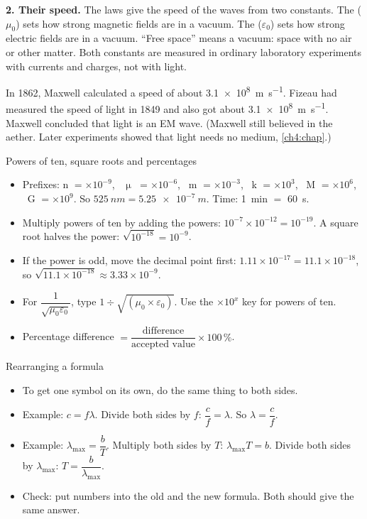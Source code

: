 \textbf{2. Their speed.} The laws give the speed of the waves from two constants. The
 ($\mu_0$) sets how strong magnetic fields are in a vacuum.
The  ($\varepsilon_0$) sets how strong electric fields are in
a vacuum. ``Free space'' means a vacuum: space with no air or other matter. Both constants are
measured in ordinary laboratory experiments with currents and charges, not with light.

In 1862, Maxwell calculated a speed of about \qty{3.1e8}{m.s^{-1}}. Fizeau had measured the
speed of light in 1849 and also got about \qty{3.1e8}{m.s^{-1}}. Maxwell concluded that light is
an EM wave. (Maxwell still believed in the aether. Later experiments showed that light needs no
medium, \cref{ch4:chap}.)

\begin{toolkit}{Powers of ten, square roots and percentages}
\begin{itemize}
  \item Prefixes: n $=\times10^{-9}$, \ $\upmu$ $=\times10^{-6}$, \ m $=\times10^{-3}$,
        \ k $=\times10^{3}$, \ M $=\times10^{6}$, \ G $=\times10^{9}$. So
        $\qty{525}{nm} = \qty{5.25e-7}{m}$. Time: \qty{1}{min} $=$ \qty{60}{s}.
  \item Multiply powers of ten by adding the powers: $10^{-7}\times10^{-12} = 10^{-19}$. A
        square root halves the power: $\sqrt{10^{-18}} = 10^{-9}$.
  \item If the power is odd, move the decimal point first: $1.11\times10^{-17} =
        11.1\times10^{-18}$, so $\sqrt{11.1\times10^{-18}} \approx 3.33\times10^{-9}$.
  \item For $\dfrac{1}{\sqrt{\mu_0\varepsilon_0}}$, type $1 \div \sqrt{(\mu_0 \times
        \varepsilon_0)}$. Use the $\times10^{x}$ key for powers of ten.
  \item Percentage difference $= \dfrac{\text{difference}}{\text{accepted value}}\times100\,\%$.
\end{itemize}
\end{toolkit}

\begin{toolkit}{Rearranging a formula}
\begin{itemize}
  \item To get one symbol on its own, do the same thing to both sides.
  \item Example: $c = f\lambda$. Divide both sides by $f$: $\dfrac{c}{f} = \lambda$. So
        $\lambda = \dfrac{c}{f}$.
  \item Example: $\lambda_\mathrm{max} = \dfrac{b}{T}$. Multiply both sides by $T$:
        $\lambda_\mathrm{max}T = b$. Divide both sides by $\lambda_\mathrm{max}$:
        $T = \dfrac{b}{\lambda_\mathrm{max}}$.
  \item Check: put numbers into the old and the new formula. Both should give the same answer.
\end{itemize}
\end{toolkit}

